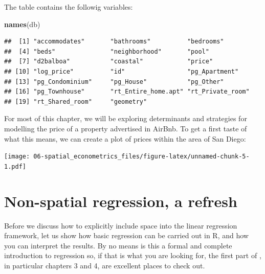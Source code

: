 \documentclass[
]{book}
\newenvironment{Shaded}{\begin{snugshade}}{\end{snugshade}}
\newcommand{\DataTypeTok}[1]{\textcolor[rgb]{0.13,0.29,0.53}{#1}}
\newcommand{\KeywordTok}[1]{\textcolor[rgb]{0.13,0.29,0.53}{\textbf{#1}}}
\newcommand{\NormalTok}[1]{#1}
\newcommand{\OperatorTok}[1]{\textcolor[rgb]{0.81,0.36,0.00}{\textbf{#1}}}
\newcommand{\StringTok}[1]{\textcolor[rgb]{0.31,0.60,0.02}{#1}}
\begin{document}
The table contains the followig variables:

\begin{Shaded}
\begin{Highlighting}[]
\KeywordTok{names}\NormalTok{(db)}
\end{Highlighting}
\end{Shaded}

\begin{verbatim}
##  [1] "accommodates"       "bathrooms"          "bedrooms"          
##  [4] "beds"               "neighborhood"       "pool"              
##  [7] "d2balboa"           "coastal"            "price"             
## [10] "log_price"          "id"                 "pg_Apartment"      
## [13] "pg_Condominium"     "pg_House"           "pg_Other"          
## [16] "pg_Townhouse"       "rt_Entire_home.apt" "rt_Private_room"   
## [19] "rt_Shared_room"     "geometry"
\end{verbatim}

For most of this chapter, we will be exploring determinants and strategies for modelling the price of a property advertised in AirBnb. To get a first taste of what this means, we can create a plot of prices within the area of San Diego:

\begin{Shaded}
\end{Shaded}

\texttt{[image: 06-spatial\_econometrics\_files/figure-latex/unnamed-chunk-5-1.pdf]}

\hypertarget{non-spatial-regression-a-refresh}{%
\section{Non-spatial regression, a refresh}\label{non-spatial-regression-a-refresh}}

Before we discuss how to explicitly include space into the linear regression framework, let us show how basic regression can be carried out in R, and how you can interpret the results. By no means is this a formal and complete introduction to regression so, if that is what you are looking for, the first part of \citet{gelman2006data}, in particular chapters 3 and 4, are excellent places to check out.
\end{document}
